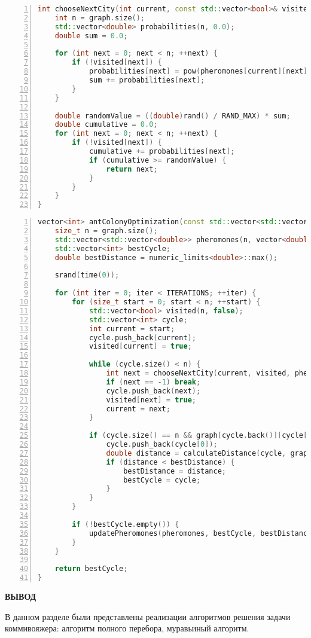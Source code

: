 \begin{center}
\captionsetup{justification=raggedright,singlelinecheck=off}
\begin{lstlisting}[language=C++, frame=single, numbers=left, label=lst:vinograd_mod, caption=Реализация функции выбора следующей вершины]
int chooseNextCity(int current, const std::vector<bool>& visited, const std::vector<std::vector<double>>& pheromones, const std::vector<std::vector<int>>& graph) {
    int n = graph.size();
    std::vector<double> probabilities(n, 0.0);
    double sum = 0.0;

    for (int next = 0; next < n; ++next) {
        if (!visited[next]) {
            probabilities[next] = pow(pheromones[current][next], ALPHA) * pow(1.0 / graph[current][next], BETA);
            sum += probabilities[next];
        }
    }

    double randomValue = ((double)rand() / RAND_MAX) * sum;
    double cumulative = 0.0;
    for (int next = 0; next < n; ++next) {
        if (!visited[next]) {
            cumulative += probabilities[next];
            if (cumulative >= randomValue) {
                return next;
            }
        }
    }
}
\end{lstlisting}
\end{center}

\begin{center}
\captionsetup{justification=raggedright,singlelinecheck=off}
\begin{lstlisting}[language=C++, frame=single, numbers=left, label=lst:last, caption=Реализация муравьиного алгоритма]
vector<int> antColonyOptimization(const std::vector<std::vector<int>>& graph) {
    size_t n = graph.size();
    std::vector<std::vector<double>> pheromones(n, vector<double>(n, 1.0));
    std::vector<int> bestCycle;
    double bestDistance = numeric_limits<double>::max();

    srand(time(0));

    for (int iter = 0; iter < ITERATIONS; ++iter) {
        for (size_t start = 0; start < n; ++start) {
            std::vector<bool> visited(n, false);
            std::vector<int> cycle;
            int current = start;
            cycle.push_back(current);
            visited[current] = true;

            while (cycle.size() < n) {
                int next = chooseNextCity(current, visited, pheromones, graph);
                if (next == -1) break;
                cycle.push_back(next);
                visited[next] = true;
                current = next;
            }

            if (cycle.size() == n && graph[cycle.back()][cycle[0]] > 0) {
                cycle.push_back(cycle[0]);
                double distance = calculateDistance(cycle, graph);
                if (distance < bestDistance) {
                    bestDistance = distance;
                    bestCycle = cycle;
                }
            }
        }

        if (!bestCycle.empty()) {
            updatePheromones(pheromones, bestCycle, bestDistance);
        }
    }

    return bestCycle;
}
\end{lstlisting}
\end{center}


\textbf{ВЫВОД}

В данном разделе были представлены реализации алгоритмов решения задачи коммивояжера: алгоритм полного перебора, муравьиный алгоритм.

\clearpage